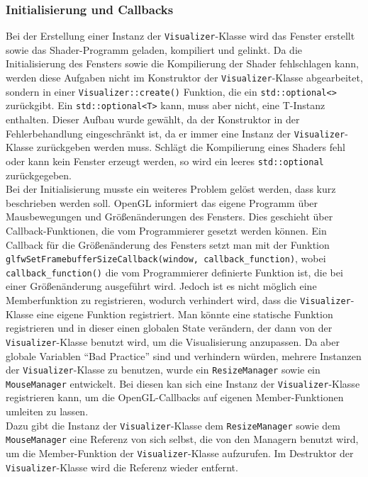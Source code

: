 \documentclass[11pt,a4paper]{article}
\begin{document}
\subsubsection{Initialisierung und Callbacks}
Bei der Erstellung einer Instanz der \lstinline!Visualizer!-Klasse wird das Fenster erstellt sowie das Shader-Programm geladen, kompiliert und gelinkt. Da die Initialisierung des Fensters sowie die Kompilierung der Shader fehlschlagen kann, werden diese Aufgaben nicht im Konstruktor der \lstinline!Visualizer!-Klasse abgearbeitet, sondern in einer \lstinline!Visualizer::create()! Funktion, die ein \lstinline!std::optional<>! zurückgibt. Ein \lstinline!std::optional<T>! kann, muss aber nicht, eine T-Instanz enthalten. Dieser Aufbau wurde gewählt, da der Konstruktor in der Fehlerbehandlung eingeschränkt ist, da er immer eine Instanz der \lstinline!Visualizer!-Klasse zurückgeben werden muss. Schlägt die Kompilierung eines Shaders fehl oder kann kein Fenster erzeugt werden, so wird ein leeres \lstinline!std::optional! zurückgegeben.\\
Bei der Initialisierung musste ein weiteres Problem gelöst werden, dass kurz beschrieben werden soll. OpenGL informiert das eigene Programm über Mausbewegungen und Größenänderungen des Fensters. Dies geschieht über Callback-Funktionen, die vom Programmierer gesetzt werden können. Ein Callback für die Größenänderung des Fensters setzt man mit der Funktion \lstinline!glfwSetFramebufferSizeCallback(window, callback_function)!, wobei \lstinline!callback_function()! die vom Programmierer definierte Funktion ist, die bei einer Größenänderung ausgeführt wird. Jedoch ist es nicht möglich eine Memberfunktion zu registrieren, wodurch verhindert wird, dass die \lstinline!Visualizer!-Klasse eine eigene Funktion registriert. Man könnte eine statische Funktion registrieren und in dieser einen globalen State verändern, der dann von der \lstinline!Visualizer!-Klasse benutzt wird, um die Visualisierung anzupassen. Da aber globale Variablen ``Bad Practice'' sind und verhindern würden, mehrere Instanzen der \lstinline!Visualizer!-Klasse zu benutzen, wurde ein \lstinline!ResizeManager! sowie ein \lstinline!MouseManager! entwickelt. Bei diesen kan sich eine Instanz der \lstinline!Visualizer!-Klasse registrieren kann, um die OpenGL-Callbacks auf eigenen Member-Funktionen umleiten zu lassen.\\
Dazu gibt die Instanz der \lstinline!Visualizer!-Klasse dem \lstinline!ResizeManager! sowie dem \lstinline!MouseManager! eine Referenz von sich selbst, die von den Managern benutzt wird, um die Member-Funktion der \lstinline!Visualizer!-Klasse aufzurufen. Im Destruktor der \lstinline!Visualizer!-Klasse wird die Referenz wieder entfernt.
\end{document}
